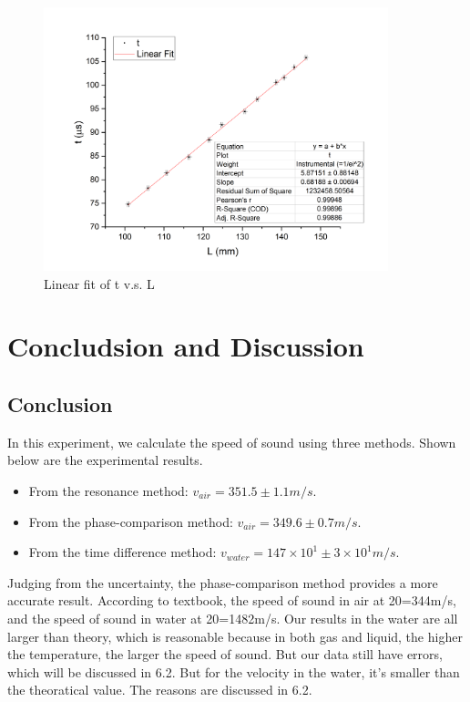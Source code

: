 \documentclass[12pt,a4paper]{article}
\begin{document}
\begin{figure}[H]
    \centering
    \includegraphics[width=10cm]{method3.png}
    \caption{Linear fit of t v.s. L}
\end{figure} 

\section{Concludsion and Discussion}
\subsection{Conclusion}
In this experiment, we calculate the speed of sound using three methods. Shown below are the experimental results.
\begin{itemize}
    \item From the resonance method: $v_{air}=351.5\pm 1.1m/s$.
    \item From the phase-comparison method: $v_{air}=349.6\pm 0.7m/s$.
    \item From the time difference method: $v_{water}=147\times 10^1\pm 3\times 10^1 m/s$.
\end{itemize} \par 
Judging from the uncertainty, the phase-comparison method provides a more accurate result. According to textbook, the speed of sound in air at 20\textcelsius=344m/s, and the speed of sound in water at 20\textcelsius=1482m/s. Our results in the water are all larger than theory, which is reasonable because in both gas and liquid, the higher the temperature, the larger the speed of sound. But our data still have errors, which will be discussed in 6.2. But for the velocity in the water, it's smaller than the theoratical value. The reasons are discussed in 6.2.
\end{document}
